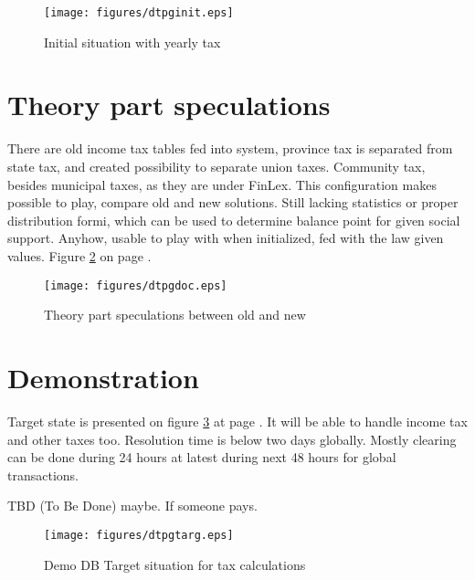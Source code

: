 \begin{figure}
 \begin{center}
  \texttt{[image: figures/dtpginit.eps]}
  \caption{Initial situation with yearly tax}
  \label{fig:DbInitial} 
 \end{center}
\end{figure}

\section{Theory part speculations}
\label{db_theory_speculations}
There are old income tax tables fed into system, province tax is separated from state tax,
and created possibility to separate union taxes. Community tax, besides municipal taxes,
as they are under FinLex. This configuration makes possible to play,
compare old and new solutions.
Still lacking statistics or proper distribution formi,
which can be used to determine balance point for given social support.
Anyhow, usable to play with when initialized, fed with the law given values.
Figure \ref{fig:DbSpeculation} on page \pageref{fig:DbSpeculation}. 

\begin{figure}
 \begin{center}
  \texttt{[image: figures/dtpgdoc.eps]}
  \caption{Theory part speculations between old and new}
  \label{fig:DbSpeculation} 
 \end{center}
\end{figure}

\section{Demonstration}
\label{implementation_demo}
Target state is presented on figure \ref{fig:DbDemoTarget} at page \pageref{fig:DbDemoTarget}.
It will be able to handle income tax and other taxes too.
Resolution time is below two days globally.
Mostly clearing can be done during 24 hours at latest during next 48 hours for global transactions.

TBD (To Be Done) maybe. If someone pays.

\begin{figure}
 \begin{center}
  \texttt{[image: figures/dtpgtarg.eps]}
  \caption{Demo DB Target situation for tax calculations}
  \label{fig:DbDemoTarget} 
 \end{center}
\end{figure}

